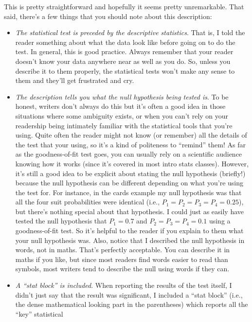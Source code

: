 \documentclass[
  a4paper,
]{book}
\providecommand{\tightlist}{%
  \setlength{\itemsep}{0pt}\setlength{\parskip}{0pt}}\usepackage{longtable,booktabs,array}
\begin{document}
This is pretty straightforward and hopefully it seems pretty
unremarkable. That said, there's a few things that you should note about
this description:

\begin{itemize}
\tightlist
\item
  \emph{The statistical test is preceded by the descriptive statistics}.
  That is, I told the reader something about what the data look like
  before going on to do the test. In general, this is good practice.
  Always remember that your reader doesn't know your data anywhere near
  as well as you do. So, unless you describe it to them properly, the
  statistical tests won't make any sense to them and they'll get
  frustrated and cry.
\item
  \emph{The description tells you what the null hypothesis being tested
  is}. To be honest, writers don't always do this but it's often a good
  idea in those situations where some ambiguity exists, or when you
  can't rely on your readership being intimately familiar with the
  statistical tools that you're using. Quite often the reader might not
  know (or remember) all the details of the test that your using, so
  it's a kind of politeness to ``remind'' them! As far as the
  goodness-of-fit test goes, you can usually rely on a scientific
  audience knowing how it works (since it's covered in most intro stats
  classes). However, it's still a good idea to be explicit about stating
  the null hypothesis (briefly!) because the null hypothesis can be
  different depending on what you're using the test for. For instance,
  in the cards example my null hypothesis was that all the four suit
  probabilities were identical (i.e., \(P_1 = P_2 = P_3 = P_4 = 0.25\)),
  but there's nothing special about that hypothesis. I could just as
  easily have tested the null hypothesis that \(P_1 = 0.7\) and
  \(P_2 = P_3 = P_4 = 0.1\) using a goodness-of-fit test. So it's
  helpful to the reader if you explain to them what your null hypothesis
  was. Also, notice that I described the null hypothesis in words, not
  in maths. That's perfectly acceptable. You can describe it in maths if
  you like, but since most readers find words easier to read than
  symbols, most writers tend to describe the null using words if they
  can.
\item
  \emph{A ``stat block'' is included}. When reporting the results of the
  test itself, I didn't just say that the result was significant, I
  included a ``stat block'' (i.e., the dense mathematical looking part
  in the parentheses) which reports all the ``key'' statistical

\end{itemize}
\end{document}
